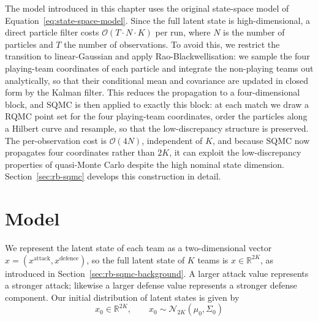 The model introduced in this chapter uses the original state-space model of Equation~\eqref{eq:state-space-model}. Since the full latent state is high-dimensional, a direct particle filter costs $\mathcal{O}(T \cdot N \cdot K)$ per run, where $N$ is the number of particles and $T$ the number of observations. To avoid this, we restrict the transition to linear-Gaussian and apply Rao-Blackwellisation: we sample the four playing-team coordinates of each particle and integrate the non-playing teams out analytically, so that their conditional mean and covariance are updated in closed form by the Kalman filter. This reduces the propagation to a four-dimensional block, and SQMC is then applied to exactly this block: at each match we draw a RQMC point set for the four playing-team coordinates, order the particles along a Hilbert curve and resample, so that the low-discrepancy structure is preserved. The per-observation cost is $\mathcal{O}(4N)$, independent of $K$, and because SQMC now propagates four coordinates rather than $2K$, it can exploit the low-discrepancy properties of quasi-Monte Carlo despite the high nominal state dimension. Section~\ref{sec:rb-sqmc} develops this construction in detail.


\section{Model}
\label{sec:model}
We represent the latent state of each team as a two-dimensional vector $x = (x^{\text{attack}}, x^{\text{defence}})$, so the full latent state of $K$ teams is $x \in \mathbb{R}^{2K}$, as introduced in Section~\ref{sec:rb-sqmc-background}. A larger attack value represents a stronger attack; likewise a larger defense value represents a stronger defense component. Our initial distribution of latent states is given by
\begin{equation}
    x_0 \in \mathbb{R}^{2K}, \qquad x_0 \sim \mathcal{N}_{2K}(\mu_0, \Sigma_0)
\end{equation}

